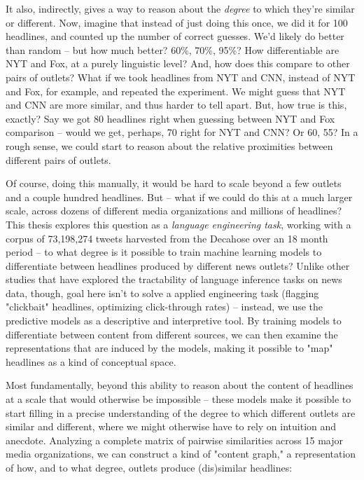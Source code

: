 \documentclass{scrartcl}
\begin{document}
It also, indirectly, gives a way to reason about the \textit{degree} to which they're similar or different. Now, imagine that instead of just doing this once, we did it for 100 headlines, and counted up the number of correct guesses. We'd likely do better than random -- but how much better? 60\%, 70\%, 95\%? How differentiable are NYT and Fox, at a purely linguistic level? And, how does this compare to other pairs of outlets? What if we took headlines from NYT and CNN, instead of NYT and Fox, for example, and repeated the experiment. We might guess that NYT and CNN are more similar, and thus harder to tell apart. But, how true is this, exactly? Say we got 80 headlines right when guessing between NYT and Fox comparison -- would we get, perhaps, 70 right for NYT and CNN? Or 60, 55? In a rough sense, we could start to reason about the relative proximities between different pairs of outlets.

Of course, doing this manually, it would be hard to scale beyond a few outlets and a couple hundred headlines. But -- what if we could do this at a much larger scale, across dozens of different media organizations and millions of headlines? This thesis explores this question as a \textit{language engineering task}, working with a corpus of 73,198,274 tweets harvested from the Decahose over an 18 month period -- to what degree is it possible to train machine learning models to differentiate between headlines produced by different news outlets? Unlike other studies that have explored the tractability of language inference tasks on news data, though, goal here isn't to solve a applied engineering task (flagging "clickbait" headlines, optimizing click-through rates) -- instead, we use the predictive models as a descriptive and interpretive tool. By training models to differentiate between content from different sources, we can then examine the representations that are induced by the models, making it possible to "map" headlines as a kind of conceptual space.

Most fundamentally, beyond this ability to reason about the content of headlines at a scale that would otherwise be impossible -- these models make it possible to start filling in a precise understanding of the degree to which different outlets are similar and different, where we might otherwise have to rely on intuition and anecdote. Analyzing a complete matrix of pairwise similarities across 15 major media organizations, we can construct a kind of "content graph," a representation of how, and to what degree, outlets produce (dis)similar headlines:
\end{document}

